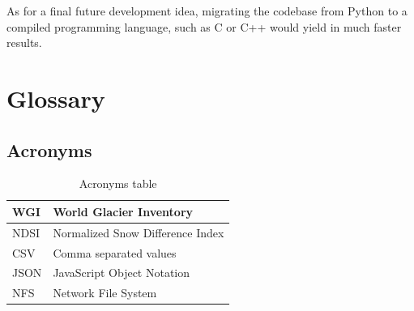 \documentclass[12pt, a4paper]{report}
\begin{document}
	\par As for a final future development idea, migrating the codebase from Python to a compiled programming language, such as C or C++ would yield in much faster results.
	
	\newpage{}	
	
	
	
	\newpage{}
	\chapter{Glossary}
	
	
	\section{Acronyms}
	
		\begin{table} [H]
		\centering
		\begin{tabular} {|  l | L{10cm} |}
			\hline
			WGI & World Glacier Inventory \\ [0.2ex]
			\hline
			NDSI & Normalized Snow Difference Index \\ [0.2ex]
			\hline
			CSV & Comma separated values \\ [0.2ex]
			\hline
			JSON & JavaScript Object Notation \\ [0.2ex]
			\hline
			NFS & Network File System \\ [0.2ex]
			\hline
		\end{tabular}
		\caption{Acronyms table }
		\label{table:acron}
	\end{table}
	
\end{document}
